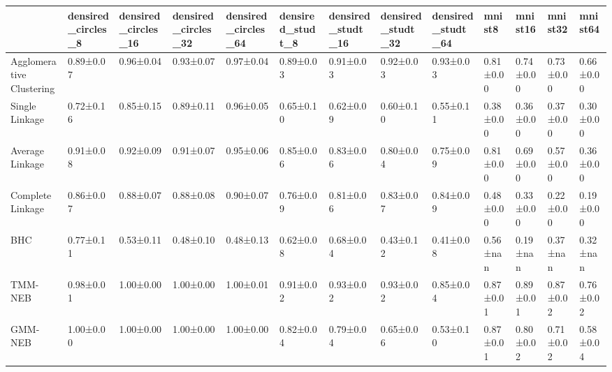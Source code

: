 \begin{tabular}{lllllllllllll}
\toprule
 & densired_circles_8 & densired_circles_16 & densired_circles_32 & densired_circles_64 & densired_studt_8 & densired_studt_16 & densired_studt_32 & densired_studt_64 & mnist8 & mnist16 & mnist32 & mnist64 \\
\midrule
Agglomerative
Clustering & 0.89±0.07 & 0.96±0.04 & 0.93±0.07 & 0.97±0.04 & 0.89±0.03 & 0.91±0.03 & 0.92±0.03 & 0.93±0.03 & 0.81±0.00 & 0.74±0.00 & 0.73±0.00 & 0.66±0.00 \\
Single
Linkage & 0.72±0.16 & 0.85±0.15 & 0.89±0.11 & 0.96±0.05 & 0.65±0.10 & 0.62±0.09 & 0.60±0.10 & 0.55±0.11 & 0.38±0.00 & 0.36±0.00 & 0.37±0.00 & 0.30±0.00 \\
Average
Linkage & 0.91±0.08 & 0.92±0.09 & 0.91±0.07 & 0.95±0.06 & 0.85±0.06 & 0.83±0.06 & 0.80±0.04 & 0.75±0.09 & 0.81±0.00 & 0.69±0.00 & 0.57±0.00 & 0.36±0.00 \\
Complete
Linkage & 0.86±0.07 & 0.88±0.07 & 0.88±0.08 & 0.90±0.07 & 0.76±0.09 & 0.81±0.06 & 0.83±0.07 & 0.84±0.09 & 0.48±0.00 & 0.33±0.00 & 0.22±0.00 & 0.19±0.00 \\
BHC & 0.77±0.11 & 0.53±0.11 & 0.48±0.10 & 0.48±0.13 & 0.62±0.08 & 0.68±0.04 & 0.43±0.12 & 0.41±0.08 & 0.56±nan & 0.19±nan & 0.37±nan & 0.32±nan \\
TMM-NEB & 0.98±0.01 & 1.00±0.00 & 1.00±0.00 & 1.00±0.01 & 0.91±0.02 & 0.93±0.02 & 0.93±0.02 & 0.85±0.04 & 0.87±0.01 & 0.89±0.01 & 0.87±0.02 & 0.76±0.02 \\
GMM-NEB & 1.00±0.00 & 1.00±0.00 & 1.00±0.00 & 1.00±0.00 & 0.82±0.04 & 0.79±0.04 & 0.65±0.06 & 0.53±0.10 & 0.87±0.01 & 0.80±0.02 & 0.71±0.02 & 0.58±0.04 \\
\bottomrule
\end{tabular}
